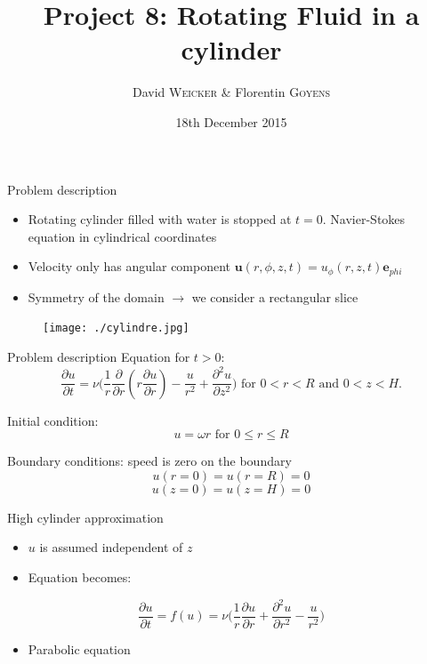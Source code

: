 \documentclass{beamer}
\title[Project SF2520]{Project 8: Rotating Fluid in a cylinder}
\author{David \textsc{Weicker} \& Florentin \textsc{Goyens} }
\institute{KTH}
\date{18th December 2015}
\newcommand{\dr}{\partial}
\begin{document}
\begin{frame}
\titlepage
\end{frame}


\begin{frame}{Problem description}

\begin{itemize}
\item Rotating cylinder filled with water is stopped at $t=0$. Navier-Stokes equation in cylindrical coordinates 
\item Velocity only has angular component $\textbf{u}(r,\phi,z,t)=u_{\phi}(r,z,t)\textbf{e}_{phi}$
\item Symmetry of the domain $\rightarrow$ we consider a rectangular slice 
\end{itemize}

\begin{figure}[!h]
\centering
\texttt{[image: ./cylindre.jpg]}
\end{figure}

\end{frame}

\begin{frame}{Problem description}
Equation for $t>0$:
$$\dfrac{\dr u}{\dr t}= \nu\Big(\frac{1}{r}\frac{\dr}{\dr r}(r\frac{\dr u}{\dr r}) - \frac{u}{r^2} + \frac{\dr^2 u}{\dr z^2}\Big) \text{ for } 0<r<R \text{ and } 0<z<H.$$

Initial condition: 
$$u = \omega r \text{ for } 0\leq r \leq R$$

Boundary conditions: speed is zero on the boundary
$$u(r = 0) = u(r = R) = 0$$
$$u(z=0)= u(z=H) = 0$$
\end{frame}

\begin{frame}{High cylinder approximation}
\begin{itemize}
\item $u$ is assumed independent of $z$
\item Equation becomes:
\end{itemize}
$$\dfrac{\dr u}{\dr t}= f(u)= \nu\Big(\frac{1}{r}\frac{\dr u}{\dr r} + \frac{\dr^2 u}{\dr r^2} - \frac{u}{r^2}\Big)$$
\begin{itemize}
\item Parabolic equation %
\end{itemize}
\end{frame}
\end{document}
